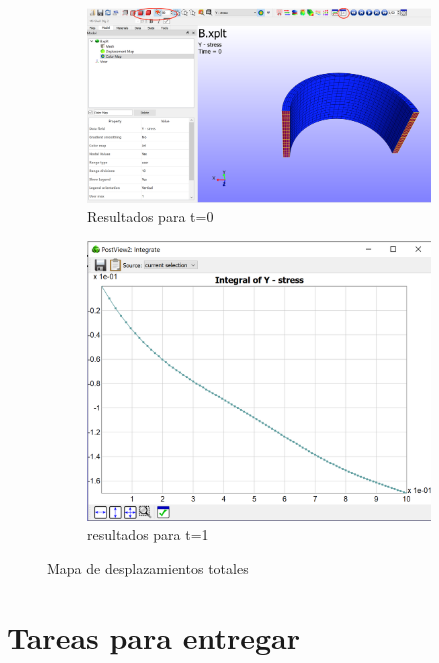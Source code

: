 \begin{figure}[!htp]
\centering
\begin{subfigure}[b]{0.55\textwidth}
\centering
\includegraphics[width=\textwidth]{figuras_3/a_p3.png}
\caption{Resultados para t=0}
\label{fig:a13}
\end{subfigure}
\begin{subfigure}[b]{0.38\textwidth}
\centering
\includegraphics[width=\textwidth]{figuras_3/a_p4.png}
\caption{resultados para t=1}
\label{fig:a14}
\end{subfigure}
\caption{Mapa de desplazamientos totales}
\label{fig:a13-14}
\end{figure}

\clearpage
\section{Tareas para entregar}
\label{sec:tareas}

